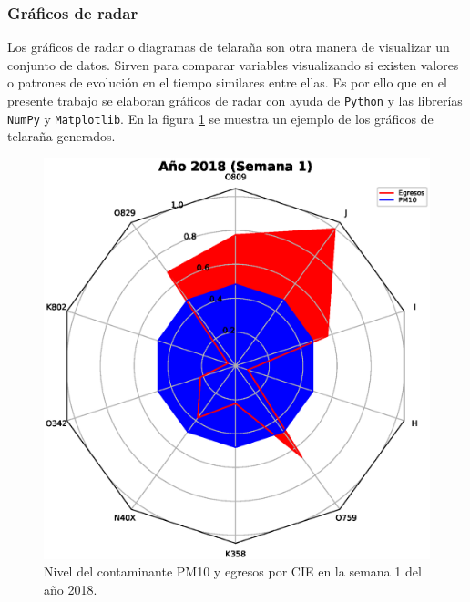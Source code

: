 
\subsubsection{Gráficos de radar}
Los gráficos de radar o diagramas de telaraña son otra manera de visualizar un conjunto de datos. Sirven para comparar variables visualizando si existen valores o patrones de evolución en el tiempo similares entre ellas. Es por ello que en el presente trabajo se elaboran gráficos de radar con ayuda de \texttt{Python} y las librerías \texttt{NumPy} y \texttt{Matplotlib}. En la figura \ref{grafico_de_telaraña} se muestra un ejemplo de los gráficos de telaraña generados.

\begin{figure}[h!]
\setcounter{figure}{0} %
\captionsetup{type=figure} %
\begin{center}
   \includegraphics[trim=0 0 0 74,clip,width=1\textwidth]{spiderweb_PM10_2018_1.eps}
   \end{center}
    \caption[Ejemplo de gráfico de radar]{Nivel del contaminante PM10 y egresos por CIE en la semana 1 del año 2018.}
    \label{grafico_de_telaraña}
\end{figure}

